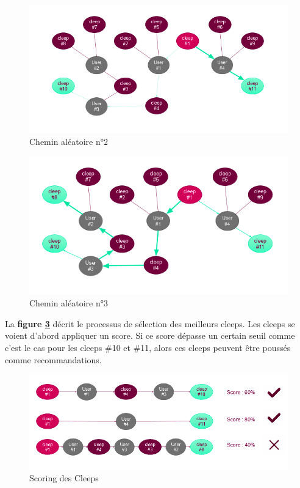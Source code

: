 \documentclass{article} %
\begin{document}
\begin{figure}[!h]
 \centering
 \includegraphics[keepaspectratio = true,scale=0.6]{ex3}
 \caption{Chemin aléatoire n°2}
 \label{fig:ex3}
\end{figure}

\begin{figure}[!h]
 \centering
 \includegraphics[keepaspectratio = true,scale=0.6]{ex4}
 \caption{Chemin aléatoire n°3}
 \label{fig:ex4}
\end{figure}

La \textbf{figure \ref{fig:ex5}} décrit le processus de sélection des meilleurs cleeps. Les cleeps se voient d'abord appliquer un score. Si ce score dépasse un certain seuil comme c'est le cas pour les cleeps \#10 et \#11, alors ces cleeps peuvent être poussés comme recommandations.

\begin{figure}[!h]
 \centering
 \includegraphics[keepaspectratio = true,scale=0.6]{ex5}
 \caption{Scoring des Cleeps}
 \label{fig:ex5}
\end{figure}
\newpage
\end{document}
